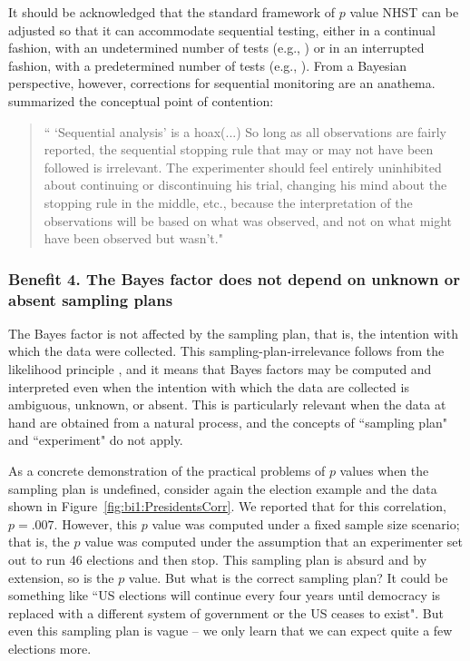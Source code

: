 It should be acknowledged that the standard framework of $p$ value NHST can be adjusted so that it can accommodate sequential testing, either in a continual fashion, with an undetermined number of tests (e.g., ) or in an interrupted fashion, with a predetermined number of tests (e.g., ). From a Bayesian perspective, however, corrections for sequential monitoring are an anathema.  summarized the conceptual point of contention:
\begin{quotation}
`` `Sequential analysis' is a hoax(...) So long as all observations are fairly reported, the sequential stopping rule that may or may not have been followed is irrelevant. The experimenter should feel entirely uninhibited about continuing or discontinuing his trial, changing his mind about the stopping rule in the middle, etc., because the interpretation of the observations will be based on what was observed, and not on what might have been observed but wasn't."
\end{quotation}

\subsubsection{Benefit 4. The Bayes factor does not depend on unknown or absent sampling plans}
The Bayes factor is not affected by the sampling plan, that is, the intention with which the data were collected. This sampling-plan-irrelevance follows from the likelihood principle \cite{BergerWolpert1988}, and it means that Bayes factors may be computed and interpreted even when the intention with which the data are collected is ambiguous, unknown, or absent. This is particularly relevant when the data at hand are obtained from a natural process, and the concepts of ``sampling plan" and ``experiment" do not apply.

As a concrete demonstration of the practical problems of $p$ values when the sampling plan is undefined, consider again the election example and the data shown in Figure~\ref{fig:bi1:PresidentsCorr}. We reported that for this correlation, $p = .007$. However, this $p$ value was computed under a fixed sample size scenario; that is, the $p$ value was computed under the assumption that an experimenter set out to run 46 elections and then stop. This sampling plan is absurd and by extension, so is the $p$ value. But what is the correct sampling plan? It could be something like ``US elections will continue every four years until democracy is replaced with a different system of government or the US ceases to exist". But even this sampling plan is vague -- we only learn that we can expect quite a few elections more.

